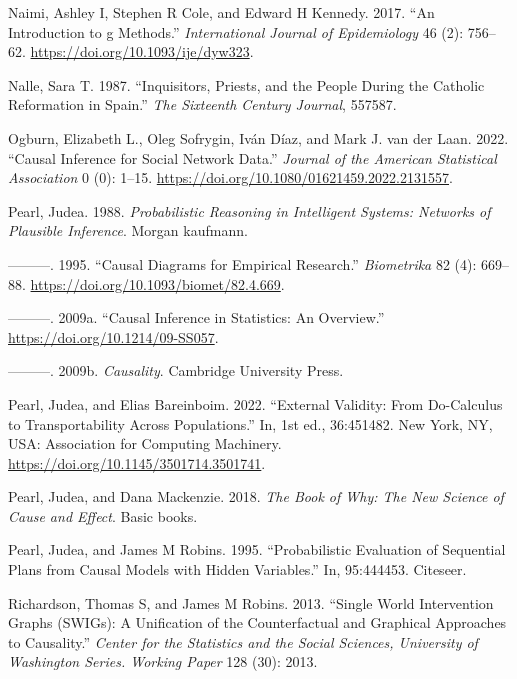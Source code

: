 \documentclass[
  singlecolumn]{article}
\newlength{\cslhangindent}
\newlength{\cslentryspacingunit} %
\newenvironment{CSLReferences}[2] %
 {%
  \setlength{\parindent}{0pt}
  \ifodd #1
  \let\oldpar\par
  \def\par{\hangindent=\cslhangindent\oldpar}
  \fi
  \setlength{\parskip}{#2\cslentryspacingunit}
 }%
 {}
\begin{document}
\begin{CSLReferences}{1}{0}
\leavevmode{}%
Naimi, Ashley I, Stephen R Cole, and Edward H Kennedy. 2017. {``An
Introduction to g Methods.''} \emph{International Journal of
Epidemiology} 46 (2): 756--62. \url{https://doi.org/10.1093/ije/dyw323}.

\leavevmode{}%
Nalle, Sara T. 1987. {``Inquisitors, Priests, and the People During the
Catholic Reformation in Spain.''} \emph{The Sixteenth Century Journal},
557587.

\leavevmode{}%
Ogburn, Elizabeth L., Oleg Sofrygin, Iván Díaz, and Mark J. van der
Laan. 2022. {``Causal Inference for Social Network Data.''}
\emph{Journal of the American Statistical Association} 0 (0): 1--15.
\url{https://doi.org/10.1080/01621459.2022.2131557}.

\leavevmode{}%
Pearl, Judea. 1988. \emph{Probabilistic Reasoning in Intelligent
Systems: Networks of Plausible Inference}. Morgan kaufmann.

\leavevmode{}%
---------. 1995. {``Causal Diagrams for Empirical Research.''}
\emph{Biometrika} 82 (4): 669--88.
\url{https://doi.org/10.1093/biomet/82.4.669}.

\leavevmode{}%
---------. 2009a. {``Causal Inference in Statistics: An Overview.''}
\url{https://doi.org/10.1214/09-SS057}.

\leavevmode{}%
---------. 2009b. \emph{Causality}. Cambridge University Press.

\leavevmode{}%
Pearl, Judea, and Elias Bareinboim. 2022. {``External Validity: From
Do-Calculus to Transportability Across Populations.''} In, 1st ed.,
36:451482. New York, NY, USA: Association for Computing Machinery.
\url{https://doi.org/10.1145/3501714.3501741}.

\leavevmode{}%
Pearl, Judea, and Dana Mackenzie. 2018. \emph{The Book of Why: The New
Science of Cause and Effect}. Basic books.

\leavevmode{}%
Pearl, Judea, and James M Robins. 1995. {``Probabilistic Evaluation of
Sequential Plans from Causal Models with Hidden Variables.''} In,
95:444453. Citeseer.

\leavevmode{}%
Richardson, Thomas S, and James M Robins. 2013. {``Single World
Intervention Graphs (SWIGs): A Unification of the Counterfactual and
Graphical Approaches to Causality.''} \emph{Center for the Statistics
and the Social Sciences, University of Washington Series. Working Paper}
128 (30): 2013.


\end{CSLReferences}
\end{document}
